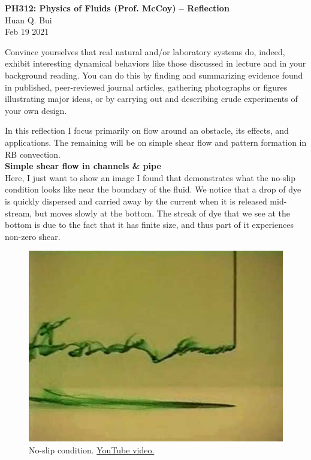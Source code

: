 \documentclass[11pt]{article}
\begin{document}
\begin{center}
{\large \bf PH312: Physics of Fluids (Prof. McCoy) -- Reflection}\\
{ Huan Q. Bui}\\
Feb 19 2021
\end{center}

\begin{framed}
	\noindent Convince yourselves that real natural and/or laboratory systems do, indeed, exhibit interesting dynamical behaviors like those discussed in lecture and in your background reading. You can do this by finding and summarizing evidence found in published, peer-reviewed journal articles, gathering photographs or figures illustrating major ideas, or by carrying out and describing crude experiments of your own design.
\end{framed}

In this reflection I focus primarily on flow around an obstacle, its effects, and applications. The remaining will be on simple shear flow and pattern formation in RB convection. \\


\noindent \textbf{Simple shear flow in channels \& pipe}\\

Here, I just want to show an image I found that demonstrates what the no-slip condition looks like near the boundary of the fluid. We notice that a drop of dye is quickly dispersed and carried away by the current when it is released mid-stream, but moves slowly at the bottom. The streak of dye that we see at the bottom is due to the fact that it has finite size, and thus part of it experiences non-zero shear.

\begin{figure}[!htb]
	\centering
	\includegraphics[scale=0.5]{simple-shear}
	\caption{No-slip condition.  \href{https://www.youtube.com/watch?v=cUTkqZeiMow&ab_channel=gurelyasin}{YouTube video.}}
\end{figure}
\end{document}
